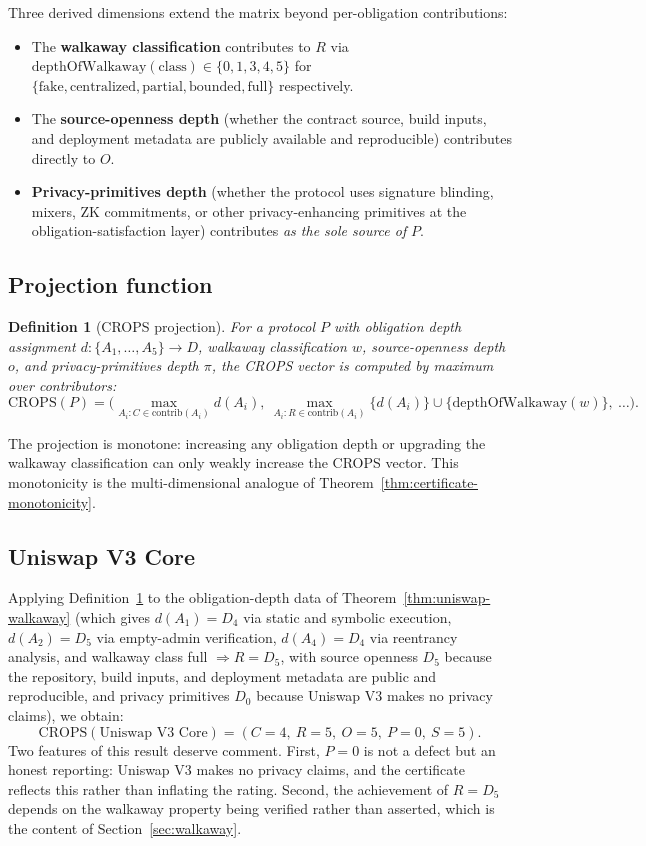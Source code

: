 \documentclass[11pt,a4paper]{article}
\newtheorem{definition}[theorem]{Definition}
\begin{document}
\noindent Three derived dimensions extend the matrix beyond per-obligation contributions:
\begin{itemize}
  \item The \textbf{walkaway classification} contributes to $R$ via $\mathrm{depthOfWalkaway}(\mathrm{class}) \in \{0,1,3,4,5\}$ for $\{\text{fake},\text{centralized},\text{partial},\text{bounded},\text{full}\}$ respectively.
  \item The \textbf{source-openness depth} (whether the contract source, build inputs, and deployment metadata are publicly available and reproducible) contributes directly to $O$.
  \item \textbf{Privacy-primitives depth} (whether the protocol uses signature blinding, mixers, ZK commitments, or other privacy-enhancing primitives at the obligation-satisfaction layer) contributes \emph{as the sole source of} $P$.
\end{itemize}

\subsection{Projection function}

\begin{definition}[CROPS projection]\label{def:crops-projection}
For a protocol $P$ with obligation depth assignment $d : \{A_1,\dots,A_5\} \to D$, walkaway classification $w$, source-openness depth $o$, and privacy-primitives depth $\pi$, the CROPS vector is computed by maximum over contributors:
\[
\mathrm{CROPS}(P) = \big(\max_{A_i : C \in \mathrm{contrib}(A_i)} d(A_i),\ \max_{A_i : R \in \mathrm{contrib}(A_i)}\!\!\!\!\!\!\!\! \{d(A_i)\} \cup \{\mathrm{depthOfWalkaway}(w)\},\ \ldots\big).
\]
\end{definition}

The projection is monotone: increasing any obligation depth or upgrading the walkaway classification can only weakly increase the CROPS vector. This monotonicity is the multi-dimensional analogue of Theorem~\ref{thm:certificate-monotonicity}.

\subsection{Uniswap V3 Core}

Applying Definition~\ref{def:crops-projection} to the obligation-depth data of Theorem~\ref{thm:uniswap-walkaway} (which gives $d(A_1)=D_4$ via static and symbolic execution, $d(A_2)=D_5$ via empty-admin verification, $d(A_4)=D_4$ via reentrancy analysis, and walkaway class full $\Rightarrow R=D_5$, with source openness $D_5$ because the repository, build inputs, and deployment metadata are public and reproducible, and privacy primitives $D_0$ because Uniswap V3 makes no privacy claims), we obtain:
\[
\mathrm{CROPS}(\text{Uniswap V3 Core}) = (C{=}4,\ R{=}5,\ O{=}5,\ P{=}0,\ S{=}5).
\]
Two features of this result deserve comment. First, $P=0$ is not a defect but an honest reporting: Uniswap V3 makes no privacy claims, and the certificate reflects this rather than inflating the rating. Second, the achievement of $R=D_5$ depends on the walkaway property being verified rather than asserted, which is the content of Section~\ref{sec:walkaway}.
\end{document}
